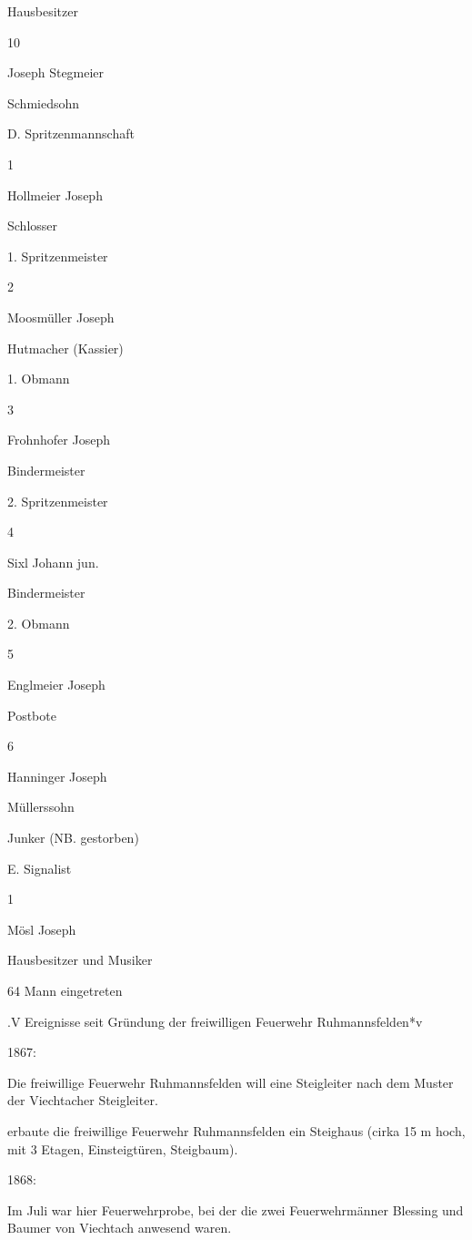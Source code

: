 Hausbesitzer



10

Joseph Stegmeier

Schmiedsohn





D. Spritzenmannschaft

1

Hollmeier Joseph

Schlosser

1. Spritzenmeister

2

Moosmüller Joseph

Hutmacher (Kassier)

1. Obmann

3

Frohnhofer Joseph

Bindermeister

2. Spritzenmeister

4

Sixl Johann jun.

Bindermeister

2. Obmann

5

Englmeier Joseph

Postbote



6

Hanninger Joseph

Müllerssohn

Junker (NB. gestorben)



E. Signalist

1

Mösl Joseph

Hausbesitzer und Musiker





64 Mann eingetreten

.V Ereignisse seit Gründung der freiwilligen Feuerwehr Ruhmannsfelden*v

1867:

Die freiwillige Feuerwehr Ruhmannsfelden will eine Steigleiter nach dem Muster
der Viechtacher Steigleiter.

erbaute die freiwillige Feuerwehr Ruhmannsfelden ein Steighaus (cirka 15 m hoch,
mit 3 Etagen, Einsteigtüren, Steigbaum).

1868:

Im Juli war hier Feuerwehrprobe, bei der die zwei Feuerwehrmänner Blessing und
Baumer von Viechtach anwesend waren.

